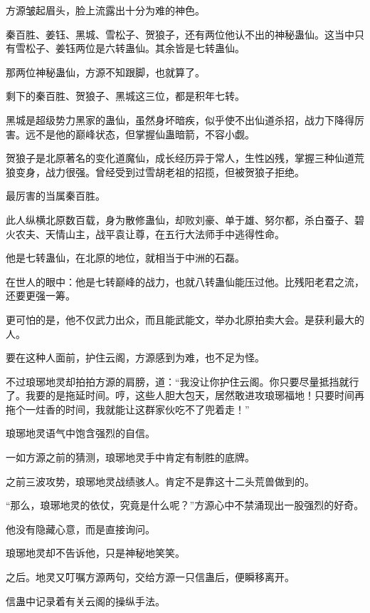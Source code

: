 
\begin{this_body}

方源皱起眉头，脸上流露出十分为难的神色。

秦百胜、姜钰、黑城、雪松子、贺狼子，还有两位他认不出的神秘蛊仙。这当中只有雪松子、姜钰两位是六转蛊仙。其余皆是七转蛊仙。

那两位神秘蛊仙，方源不知跟脚，也就算了。

剩下的秦百胜、贺狼子、黑城这三位，都是积年七转。

黑城是超级势力黑家的蛊仙，虽然身坏暗疾，似乎使不出仙道杀招，战力下降得厉害。远不是他的巅峰状态，但掌握仙蛊暗箭，不容小觑。

贺狼子是北原著名的变化道魔仙，成长经历异于常人，生性凶残，掌握三种仙道荒狼变身，战力很强。曾经受到过雪胡老祖的招揽，但被贺狼子拒绝。

最厉害的当属秦百胜。

此人纵横北原数百载，身为散修蛊仙，却败刘豪、单于雄、努尔都，杀白蚕子、碧火农夫、天情山主，战平袁让尊，在五行大法师手中逃得性命。

他是七转蛊仙，在北原的地位，就相当于中洲的石磊。

在世人的眼中：他是七转巅峰的战力，也就八转蛊仙能压过他。比残阳老君之流，还要更强一筹。

更可怕的是，他不仅武力出众，而且能武能文，举办北原拍卖大会。是获利最大的人。

要在这种人面前，护住云阁，方源感到为难，也不足为怪。

不过琅琊地灵却拍拍方源的肩膀，道：“我没让你护住云阁。你只要尽量抵挡就行了。我要的是拖延时间。哼，这些人胆大包天，居然敢进攻琅琊福地！只要时间再拖个一炷香的时间，我就能让这群家伙吃不了兜着走！”

琅琊地灵语气中饱含强烈的自信。

一如方源之前的猜测，琅琊地灵手中肯定有制胜的底牌。

之前三波攻势，琅琊地灵战绩骇人。肯定不是靠这十二头荒兽做到的。

“那么，琅琊地灵的依仗，究竟是什么呢？”方源心中不禁涌现出一股强烈的好奇。

他没有隐藏心意，而是直接询问。

琅琊地灵却不告诉他，只是神秘地笑笑。

之后。地灵又叮嘱方源两句，交给方源一只信蛊后，便瞬移离开。

信蛊中记录着有关云阁的操纵手法。


\end{this_body}
